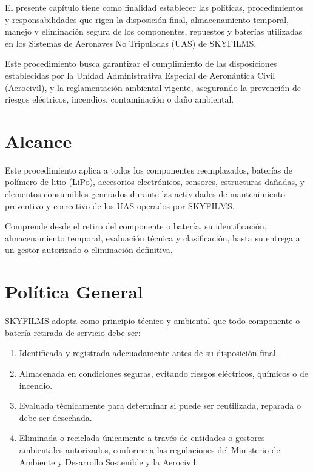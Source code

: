 El presente capítulo tiene como finalidad establecer las políticas, procedimientos y responsabilidades que rigen la disposición final, almacenamiento temporal, manejo y eliminación segura de los componentes, repuestos y baterías utilizadas en los Sistemas de Aeronaves No Tripuladas (UAS) de SKYFILMS.

Este procedimiento busca garantizar el cumplimiento de las disposiciones establecidas por la Unidad Administrativa Especial de Aeronáutica Civil (Aerocivil), y la reglamentación ambiental vigente, asegurando la prevención de riesgos eléctricos, incendios, contaminación o daño ambiental.

\section{Alcance}
Este procedimiento aplica a todos los componentes reemplazados, baterías de polímero de litio (LiPo), accesorios electrónicos, sensores, estructuras dañadas, y elementos consumibles generados durante las actividades de mantenimiento preventivo y correctivo de los UAS operados por SKYFILMS.

Comprende desde el retiro del componente o batería, su identificación, almacenamiento temporal, evaluación técnica y clasificación, hasta su entrega a un gestor autorizado o eliminación definitiva.

\section{Política General}
SKYFILMS adopta como principio técnico y ambiental que todo componente o batería retirada de servicio debe ser:

\begin{enumerate}
    \item Identificada y registrada adecuadamente antes de su disposición final.

    \item Almacenada en condiciones seguras, evitando riesgos eléctricos, químicos o de incendio.

    \item Evaluada técnicamente para determinar si puede ser reutilizada, reparada o debe ser desechada.

    \item Eliminada o reciclada únicamente a través de entidades o gestores ambientales autorizados, conforme a las regulaciones del Ministerio de Ambiente y Desarrollo Sostenible y la Aerocivil.
\end{enumerate}

